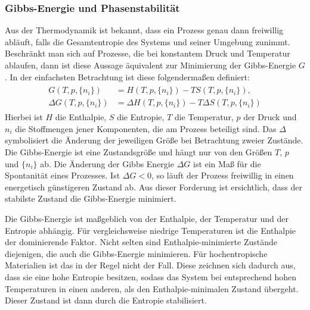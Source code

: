 \subsubsection{Gibbs-Energie und Phasenstabilität}
Aus der Thermodynamik ist bekannt, dass ein Prozess genau dann freiwillig abläuft, falls die Gesamtentropie des
Systems und seiner Umgebung zunimmt.
Beschränkt man sich auf Prozesse, die bei konstantem Druck und Temperatur ablaufen, dann ist diese Aussage äquivalent
zur Minimierung der Gibbs-Energie $G$.
In der einfachsten Betrachtung ist diese folgendermaßen definiert:
\begin{align}
    \begin{split}
        G(T,p, \{ n_{i} \})&=H(T,p,\{ n_{i} \})-TS(T,p,\{ n_{i} \}), \\
        \Delta G(T, p, \{ n_{i} \})&=\Delta H(T,p, \{ n_{i} \})-T \Delta S(T,p, \{ n_{i} \})
    \end{split}
    \label{eq:gibbs}
\end{align}
Hierbei ist $H$ die Enthalpie, $S$ die Entropie, $T$ die Temperatur, $p$ der Druck und $n_{i}$ die Stoffmengen jener
Komponenten, die am Prozess beteiligt sind.
Das $\Delta$ symbolisiert die Änderung der jeweiligen Größe bei Betrachtung zweier Zustände.
Die Gibbs-Energie ist eine Zustandsgröße und hängt nur von den Größen $T$, $p$ und $\{ n_{i} \}$ ab.
Die Änderung der Gibbs Energie $\Delta G$ ist ein Maß für die Spontanität eines Prozesses.
Ist $\Delta G < 0$, so läuft der Prozess freiwillig in einen energetisch günstigeren Zustand ab.
Aus dieser Forderung ist ersichtlich, dass der stabilste Zustand die Gibbs-Energie minimiert.\autocite[7]{rost_phd}

Die Gibbs-Energie ist maßgeblich von der Enthalpie, der Temperatur und der Entropie abhängig.
Für vergleichsweise niedrige Temperaturen ist die Enthalpie der dominierende Faktor.
Nicht selten sind Enthalpie-minimierte Zustände diejenigen, die auch die Gibbs-Energie minimieren.
Für hochentropische Materialien ist das in der Regel nicht der Fall.
Diese zeichnen sich dadurch aus, dass sie eine hohe Entropie besitzen, sodass das System
bei entsprechend hohen Temperaturen in einen anderen, als den Enthalpie-minimalen Zustand übergeht.
Dieser Zustand ist dann durch die Entropie stabilisiert.\autocite[2]{Rost2015}

